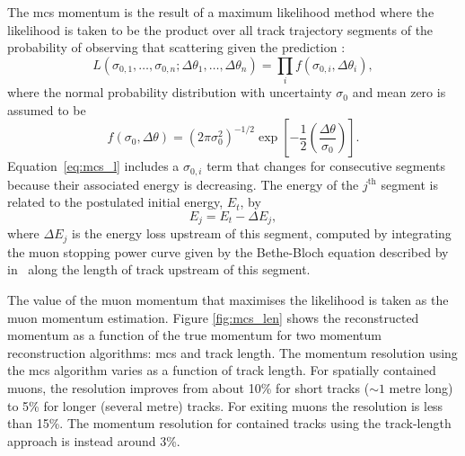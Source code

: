 The \acrshort{mcs} momentum is the result of a maximum likelihood method where the likelihood is taken to be the product over all track trajectory segments of the probability of observing that scattering given the prediction \cite{mcs}:
\begin{equation}
\label{eq:mcs_l}
L(\sigma_{0,1}, \dots, \sigma_{0,n};\Delta\theta_1, \dots, \Delta\theta_n) = \prod_i f(\sigma_{0,i}, \Delta\theta_i),
\end{equation}
where the normal probability distribution with uncertainty $\sigma_0$ and mean zero is assumed to be
\begin{equation}
f(\sigma_{0}, \Delta\theta) = (2\pi\sigma_0^2)^{-1/2}\exp\left[ -\frac{1}{2}\left( \frac{\Delta\theta}{\sigma_0} \right) \right].
\end{equation}
Equation~\eqref{eq:mcs_l} includes a $\sigma_{0,i}$ term that changes for consecutive segments because their associated energy is decreasing. The energy of the $j^\text{th}$ segment is related to the postulated initial energy, $E_t$, by 
\begin{equation}
E_j = E_t - \Delta E_j,
\end{equation}
where $\Delta E_j$ is the energy loss upstream of this segment, computed by integrating the muon stopping power curve given by the Bethe-Bloch equation described by in~\cite{pdg_mcs} along the length of track upstream of this segment.

The value of the muon momentum that maximises the likelihood is taken as the muon momentum estimation.
Figure \ref{fig:mcs_len} shows the reconstructed momentum as a function of the true momentum for two momentum reconstruction algorithms: \acrshort{mcs} and track length.
The momentum resolution using the \acrshort{mcs} algorithm varies as a function of track length. For spatially contained muons, the resolution improves from about 10\% for short tracks ($\sim 1$ metre long) to 5\% for longer (several metre) tracks. For exiting muons the resolution is less than 15\%.
The momentum resolution for contained tracks using the track-length approach is instead around 3\%.



